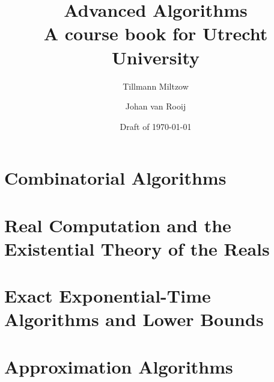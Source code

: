 \documentclass[11pt,a4paper,openany]{book}
\title{\Huge Advanced Algorithms\\[1ex]
       \large A course book for Utrecht University}
\author{Tillmann Miltzow \and Johan van Rooij}
\date{Draft of \today}
\begin{document}
\frontmatter
\maketitle

\tableofcontents

\mainmatter



\part{Combinatorial Algorithms}






\part{Real Computation and the Existential Theory of the Reals}




\part{Exact Exponential-Time Algorithms and Lower Bounds}




\part{Approximation Algorithms}


\end{document}
